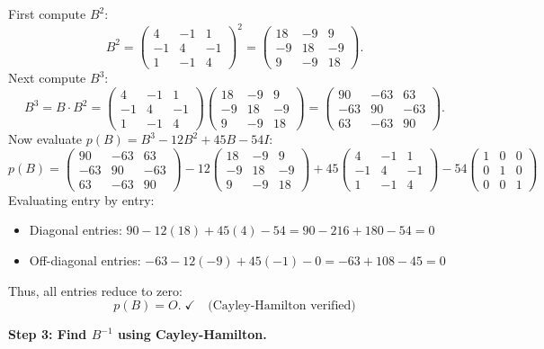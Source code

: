 \documentclass[12pt,a3paper]{article}
\begin{document}
\begin{tcolorbox}[enhanced,breakable,
  colback=cE!4,colframe=cE,boxrule=0.8pt,arc=5pt,
  title={\textbf{Answer --- Cayley-Hamilton Theorem \& $B^{-1}$}},
  fonttitle=\bfseries\color{white},colbacktitle=cE]
First compute $B^2$:
\[
B^2=\begin{pmatrix}4&-1&1\\-1&4&-1\\1&-1&4\end{pmatrix}^2=\begin{pmatrix}18&-9&9\\-9&18&-9\\9&-9&18\end{pmatrix}.
\]
Next compute $B^3$:
\[
B^3 = B\cdot B^2 = \begin{pmatrix}4&-1&1\\-1&4&-1\\1&-1&4\end{pmatrix}\begin{pmatrix}18&-9&9\\-9&18&-9\\9&-9&18\end{pmatrix} = \begin{pmatrix}90&-63&63\\-63&90&-63\\63&-63&90\end{pmatrix}.
\]
Now evaluate $p(B)=B^3-12B^2+45B-54I$:
\[
p(B) = \begin{pmatrix}90&-63&63\\-63&90&-63\\63&-63&90\end{pmatrix} - 12\begin{pmatrix}18&-9&9\\-9&18&-9\\9&-9&18\end{pmatrix} + 45\begin{pmatrix}4&-1&1\\-1&4&-1\\1&-1&4\end{pmatrix} - 54\begin{pmatrix}1&0&0\\0&1&0\\0&0&1\end{pmatrix}
\]
Evaluating entry by entry:
\begin{itemize}
    \item Diagonal entries: $90 - 12(18) + 45(4) - 54 = 90 - 216 + 180 - 54 = 0$
    \item Off-diagonal entries: $-63 - 12(-9) + 45(-1) - 0 = -63 + 108 - 45 = 0$
\end{itemize}
Thus, all entries reduce to zero:
\[
p(B)=O.\;\checkmark\quad\text{(Cayley-Hamilton verified)}
\]

\textbf{Step 3: Find $B^{-1}$ using Cayley-Hamilton.}


\end{tcolorbox}
\end{document}

